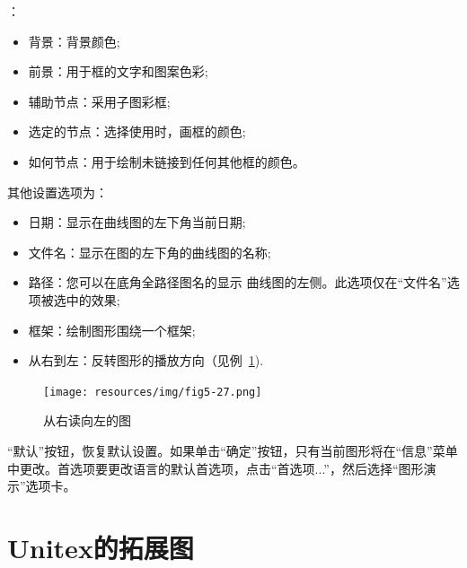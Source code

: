 \bigskip
{}：
\begin{itemize}
  \item 背景：背景颜色;
\item 前景：用于框的文字和图案色彩;
\item 辅助节点：采用子图彩框;
\item 选定的节点：选择使用时，画框的颜色;
\item 如何节点：用于绘制未链接到任何其他框的颜色。\end{itemize}

\bigskip
\noindent 其他设置选项为：
\begin{itemize}
  \item 日期：显示在曲线图的左下角当前日期;
\item 文件名：显示在图的左下角的曲线图的名称;
\item 路径：您可以在底角全路径图名的显示
曲线图的左侧。此选项仅在“文件名”选项被选中的效果;
\item 框架：绘制图形围绕一个框架;
\item 从右到左：反转图形的播放方向（见例~\ref{fig-right-to-left-graph}).
\end{itemize}

\bigskip
\begin{figure}[!h]
\begin{center}
\texttt{[image: resources/img/fig5-27.png]}
\caption{从右读向左的图\label{fig-right-to-left-graph}}
\end{center}
\end{figure}

\bigskip
{}“默认”按钮，恢复默认设置。如果单击“确定”按钮，只有当前图形将在“信息”菜单中更改。首选项要更改语言的默认首选项，点击“首选项...”，然后选择“图形演示”选项卡。



\section{Unitex的拓展图}
\label{exporting-graphs}
